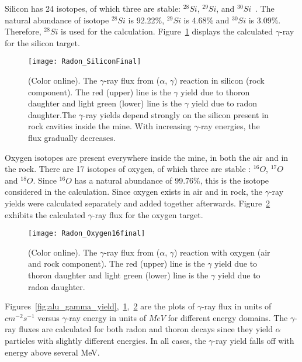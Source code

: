 \documentclass[aps,prc,showpacs,twocolumn,superscriptaddress]{revtex4-1}
\begin{document}
Silicon has 24 isotopes, of which three are stable: $^{28}Si$, $^{29}Si$, and $^{30}Si$~\cite{isotop1}. The natural abundance of isotope $^{28}Si$ is 92.22$\%$, $^{29}Si$ is 4.68$\%$ and $^{30}Si$ is 3.09$\%$. Therefore, $^{28}Si$ is used for the  calculation. Figure~\ref{fig:Sil_gamma_yield} displays the calculated $\gamma$-ray for the silicon target. 
\begin{figure}[H]
\centering
\texttt{[image: Radon\_SiliconFinal]}
\caption {(Color online). The $\gamma$-ray flux from ($\alpha$, $\gamma$) reaction in silicon (rock component). The red (upper) line is the $\gamma$ yield due to thoron daughter and light green (lower) line is the $\gamma$ yield due to radon daughter.The $\gamma$-ray yields depend strongly on the silicon present in rock cavities inside the mine. With increasing $\gamma$-ray energies, the flux gradually decreases.} 
\label{fig:Sil_gamma_yield}
\end{figure}

Oxygen isotopes are present everywhere inside the mine, in both the air and in the rock. There are 17 isotopes of oxygen, of which three are stable \cite{isotop2}: $^{16}O$, $^{17}O$ and $^{18}O$. Since $^{16}O$ has a natural abundance of 99.76$\%$, this is the isotope considered in the calculation. Since oxygen exists in air and in rock, the $\gamma$-ray yields were calculated separately and added together afterwards. Figure~\ref{fig:oxy_gamma_yield} exhibits the calculated $\gamma$-ray flux for the oxygen target. 
\begin{figure} [H]
\centering
\texttt{[image: Radon\_Oxygen16final]}
\caption {(Color online). The $\gamma$-ray flux from ($\alpha$, $\gamma$) reaction with oxygen (air and rock component). The red (upper) line is the $\gamma$ yield due to thoron daughter and light green (lower) line is the $\gamma$ yield due to radon daughter. } 
\label{fig:oxy_gamma_yield}
\end{figure}

Figures~\ref{fig:alu_gamma_yield},~\ref{fig:Sil_gamma_yield},~\ref{fig:oxy_gamma_yield} are the plots of $\gamma$-ray flux in units of $cm^{-2}s^{-1}$ versus $\gamma$-ray energy in units of $MeV$ for different energy domains. The $\gamma$-ray fluxes are calculated for both radon and thoron decays since they yield $\alpha$ particles with slightly different energies. In all cases, the $\gamma$-ray yield falls off with energy above several MeV. 
\end{document}
